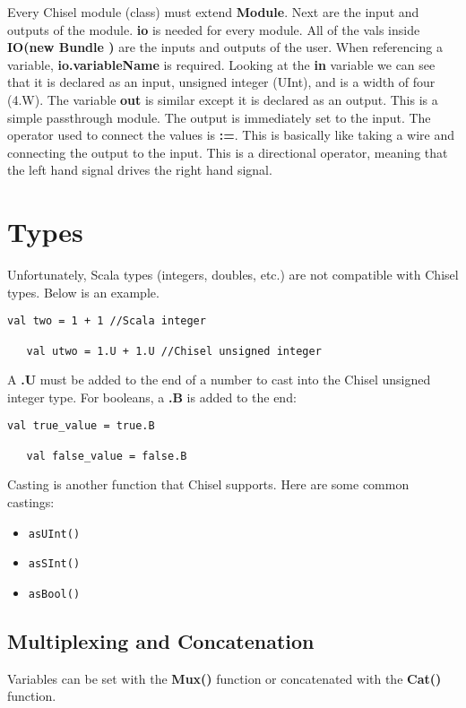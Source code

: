 \documentclass[12pt, letterpaper]{report}
\begin{document}
Every Chisel module (class) must extend \textbf{Module}. Next are the input and outputs of the module.
\textbf{io} is needed for every module. All of the vals inside \textbf{IO(new Bundle {})} are the 
inputs and outputs of the user. When referencing a variable, \textbf{io.variableName} is required.
Looking at the \textbf{in} variable we can see that it is declared as an input, unsigned integer (UInt),
and is a width of four (4.W). The variable \textbf{out} is similar except it is declared as an output.
This is a simple passthrough module. The output is immediately set to the input. The operator used to connect
the values is \textbf{:=}. This is basically like taking a wire and connecting the output to the input. This is
a directional operator, meaning that the left hand signal drives the right hand signal. 

\section{Types}
Unfortunately, Scala types (integers, doubles, etc.) are not compatible with Chisel types. Below is an example.

\begin{lstlisting}[style=scala]
   val two = 1 + 1 //Scala integer

   val utwo = 1.U + 1.U //Chisel unsigned integer

\end{lstlisting}
A \textbf{.U} must be added to the end of a number to cast into the Chisel unsigned integer type. For booleans, a \textbf{.B} is added to the end:

\begin{lstlisting}[style=scala]
   val true_value = true.B
   
   val false_value = false.B
\end{lstlisting}
Casting is another function that Chisel supports. Here are some common castings:

\begin{itemize}
   \item \verb|asUInt()|
   \item \verb|asSInt()|
   \item \verb|asBool()|
\end{itemize}

\subsection{Multiplexing and Concatenation}
Variables can be set with the \textbf{Mux()} function or concatenated with the \textbf{Cat()} function.
\end{document}
